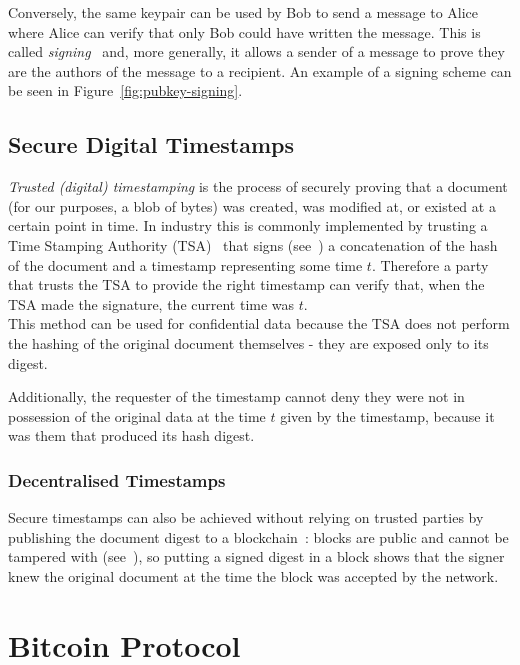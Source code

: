 Conversely, the same keypair can be used by Bob to send a message to Alice where Alice can verify that only Bob
could have written the message.
This is called \textit{signing}~\cite{smart2016signatures} and, more generally, it allows a sender of a message to
prove they are the authors of the message to a recipient.
An example of a signing scheme can be seen in Figure~\ref{fig:pubkey-signing}.

\subsection{Secure Digital Timestamps}\label{subsec:crypto:timestamps}
\textit{Trusted (digital) timestamping} is the process of securely proving that a document (for our purposes, a blob of
bytes) was created, was modified at, or existed at a certain point in time.
In industry this is commonly implemented by trusting a Time Stamping Authority (TSA)~\cite{timestamps_tsp_rfc} that
signs (see~) a concatenation of the hash of the document and a timestamp representing some
time $t$.
Therefore a party that trusts the TSA to provide the right timestamp can verify that, when the TSA made the signature,
the current time was $t$.
\\

This method can be used for confidential data because the TSA does not perform the hashing of the original document
themselves - they are exposed only to its digest.

Additionally, the requester of the timestamp cannot deny they were not in possession of the original data at the time
$t$ given by the timestamp, because it was them that produced its hash digest.

\subsubsection{Decentralised Timestamps}

Secure timestamps can also be achieved without relying on trusted parties by publishing the document digest to a
blockchain~\cite{gipp2015timestamps_btc}: blocks are public and cannot be tampered with (see~),
so putting a signed digest in a block shows that the signer knew the original document at the time the block was
accepted by the network.


\section{Bitcoin Protocol}\label{sec:bitcoin}

